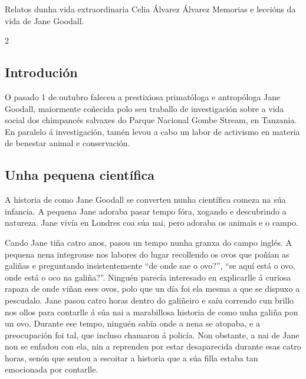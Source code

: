 \Titular*%
{historia}%
{Relatos dunha vida extraordinaria}%
{Celia Álvarez Álvarez}%
{Memorias e leccións da vida de Jane Goodall.}%

\begin{multicols}{2}

\subsection*{Introdución}

O pasado 1 de outubro faleceu a prestixiosa primatóloga e antropóloga Jane
Goodall, maiormente coñecida polo seu traballo de investigación sobre a vida
social dos chimpancés salvaxes do Parque Nacional Gombe Stream, en Tanzania. En
paralelo á investigación, tamén levou a cabo un labor de activismo en materia
de benestar animal e conservación.

\subsection*{Unha pequena científica}


A historia de como Jane Goodall se converteu nunha científica comeza na súa
infancia. A pequena Jane adoraba pasar tempo fóra, xogando e descubrindo a
natureza. Jane vivía en Londres coa súa nai, pero adoraba os animais e o campo.

Cando Jane tiña catro anos, pasou un tempo nunha granxa do campo
inglés. A pequena nena integrouse nos labores do lugar recollendo os ovos que
poñían as galiñas e preguntando insistentemente ``de onde sae o ovo?'', ``se aquí
está o ovo, onde está o oco na galiña?''. Ninguén parecía interesado en
explicarlle á curiosa rapaza de onde viñan eses ovos, polo que un día foi ela
mesma a que se dispuxo a pescudalo. Jane pasou catro horas dentro do galiñeiro
e saíu correndo cun brillo nos ollos para contarlle á súa nai a marabillosa
historia de como unha galiña pon un ovo. Durante ese tempo, ninguén sabía onde
a nena se atopaba, e a preocupación foi tal, que incluso chamaron á policía.
Non obstante, a nai de Jane non se enfadou con ela, nin a reprendeu por estar
desaparecida durante esas catro horas, senón que sentou a escoitar a historia
que a súa filla estaba tan emocionada por contarlle.


\end{multicols}
